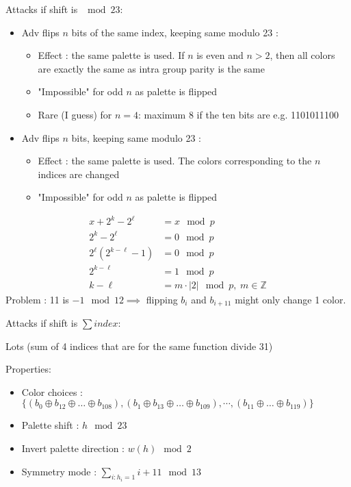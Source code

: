 \documentclass{article}
\begin{document}
Attacks if shift is $\mod 23$:
\begin{itemize}
    \item Adv flips $n$ bits of the same index, keeping same modulo 23 :
    \begin{itemize}
        \item Effect : the same palette is used. If $n$ is even and $n > 2$, then all colors are exactly the same as intra group parity is the same
        \item "Impossible" for odd $n$ as palette is flipped
        \item Rare (I guess) for $n = 4$: maximum 8 if the ten bits are e.g. 1101011100
    \end{itemize}
    \item Adv flips $n$ bits, keeping same modulo 23 :
    \begin{itemize}
        \item Effect : the same palette is used. The colors corresponding to the $n$ indices are changed
        \item "Impossible" for odd $n$ as palette is flipped
    \end{itemize}
\end{itemize}

\vspace{8pt}
\begin{align*}
	x + 2^k - 2^\ell &= x \mod p\\
	2^k - 2^\ell &= 0 \mod p\\
	2^\ell \left(2^{k - \ell} - 1 \right) &= 0 \mod p\\
	2^{k-\ell} &= 1 \mod p\\
	k - \ell &= m \cdot |2|\mod p, \hspace{3pt} m \in \mathbb Z
\end{align*}
Problem : 11 is $-1 \mod 12 \implies$ flipping $b_i$ and $b_{i+11}$ might only change 1 color.

Attacks if shift is $\sum index$:

Lots (sum of 4 indices that are for the same function divide 31)


Properties:
\begin{itemize}
	\item Color choices : $\{\left(b_0  \oplus b_{12} \oplus \dots \oplus b_{108}\right), \left(b_1 \oplus b_{13} \oplus \dots \oplus b_{109}\right), \cdots, \left(b_{11} \oplus \dots \oplus b_{119}\right)\}$
	\item Palette shift : $h \mod 23$
	\item Invert palette direction : $w(h) \mod 2$
	\item Symmetry mode : $\sum\limits_{i : h_i = 1}i + 11 \mod 13$
\end{itemize}
\end{document}
